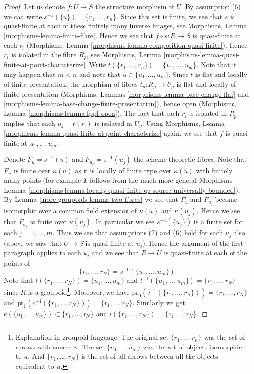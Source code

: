 \begin{proof}
Let us denote $f : U \to S$ the structure morphism of $U$.
By assumption (6) we can write $s^{-1}(\{u\}) = \{r_1, \ldots, r_n\}$.
Since this set is finite, we see that $s$ is quasi-finite at each of
these finitely many inverse images, see
Morphisms, Lemma \ref{morphisms-lemma-finite-fibre}.
Hence we see that $f \circ s : R \to S$ is quasi-finite at each $r_i$
(Morphisms, Lemma \ref{morphisms-lemma-composition-quasi-finite}).
Hence $r_i$ is isolated in the fibre $R_p$, see
Morphisms, Lemma \ref{morphisms-lemma-quasi-finite-at-point-characterize}.
Write $t(\{r_1, \ldots, r_n\}) = \{u_1, \ldots, u_m\}$.
Note that it may happen that $m < n$ and note that
$u \in \{u_1, \ldots, u_m\}$.
Since $t$ is flat and locally of finite presentation,
the morphism of fibres $t_p : R_p \to U_p$ is flat and locally of
finite presentation (Morphisms,
Lemmas \ref{morphisms-lemma-base-change-flat} and
\ref{morphisms-lemma-base-change-finite-presentation}),
hence open (Morphisms,
Lemma \ref{morphisms-lemma-fppf-open}).
The fact that each $r_i$ is isolated in $R_p$ implies that
each $u_j = t(r_i)$ is isolated in $U_p$. Using
Morphisms, Lemma \ref{morphisms-lemma-quasi-finite-at-point-characterize}
again, we see that $f$ is quasi-finite at $u_1, \ldots, u_m$.

\medskip\noindent
Denote $F_u = s^{-1}(u)$ and $F_{u_j} = s^{-1}(u_j)$ the scheme theoretic
fibres. Note that $F_u$ is finite over $\kappa(u)$ as it is locally of finite
type over $\kappa(u)$ with finitely many points (for example it follows from
the much more general
Morphisms, Lemma
\ref{morphisms-lemma-locally-quasi-finite-qc-source-universally-bounded}).
By
Lemma \ref{more-groupoids-lemma-two-fibres}
we see that $F_u$ and $F_{u_j}$ become isomorphic over a common
field extension of $\kappa(u)$ and $\kappa(u_j)$. Hence we see
that $F_{u_j}$ is finite over $\kappa(u_j)$. In particular we see
$s^{-1}(\{u_j\})$ is a finite set for each $j = 1, \ldots, m$.
Thus we see that assumptions (2) and (6) hold for each $u_j$ also
(above we saw that $U \to S$ is quasi-finite at $u_j$).
Hence the argument of the first paragraph applies to each $u_j$
and we see that $R \to U$ is quasi-finite at each of the points of
$$
\{r_1, \ldots, r_N\} = s^{-1}(\{u_1, \ldots, u_m\})
$$
Note that $t(\{r_1, \ldots, r_N\}) = \{u_1, \ldots, u_m\}$ and
$t^{-1}(\{u_1, \ldots, u_m\}) = \{r_1, \ldots, r_N\}$
since $R$ is a groupoid\footnote{Explanation in groupoid language:
The original set $\{r_1, \ldots, r_n\}$ was the set of arrows with
source $u$. The set $\{u_1, \ldots, u_m\}$ was the set of objects
isomorphic to $u$. And $\{r_1, \ldots, r_N\}$ is the set of all arrows
between all the objects equivalent to $u$.}. Moreover, we have
$\text{pr}_0(c^{-1}(\{r_1, \ldots, r_N\})) = \{r_1, \ldots, r_N\}$
and
$\text{pr}_1(c^{-1}(\{r_1, \ldots, r_N\})) = \{r_1, \ldots, r_N\}$.
Similarly we get $e(\{u_1, \ldots, u_m\}) \subset \{r_1, \ldots, r_N\}$
and $i(\{r_1, \ldots, r_N\}) = \{r_1, \ldots, r_N\}$.


\end{proof}
